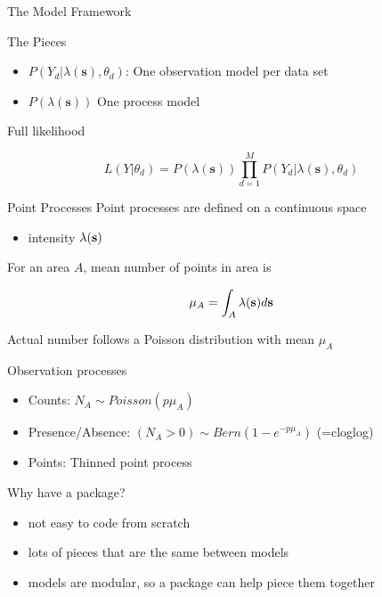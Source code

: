 \documentclass[
  ignorenonframetext,
]{beamer}
\providecommand{\tightlist}{%
  \setlength{\itemsep}{0pt}\setlength{\parskip}{0pt}}\usepackage{longtable,booktabs,array}
\begin{document}
\begin{frame}{The Model Framework}
\label{the-model-framework}
\begin{block}{The Pieces}
\label{the-pieces}
\begin{itemize}
\tightlist
\item
  \(P(Y_d | \lambda(\mathbf{s}), \theta_d)\): One observation model per
  data set
\item
  \(P(\lambda(\mathbf{s}))\) One process model
\end{itemize}

Full likelihood

\[
L(Y | \theta_d) = P(\lambda(\mathbf{s})) \prod_{d=1}^{M}P(Y_d | \lambda(\mathbf{s}), \theta_d)
\]
\end{block}

\begin{block}{Point Processes}
\label{point-processes}
Point processes are defined on a continuous space

\begin{itemize}
\tightlist
\item
  intensity \(\lambda({\bf s})\)
\end{itemize}

For an area \(A\), mean number of points in area is

\[
\mu_A = \int_A \lambda({\bf s}) d{\bf s}
\]

Actual number follows a Poisson distribution with mean \(\mu_A\)
\end{block}

\begin{block}{Observation processes}
\label{observation-processes}
\begin{itemize}
\tightlist
\item
  Counts: \(N_A \sim Poisson(p \mu_A)\)
\item
  Presence/Absence: \((N_A >0) \sim Bern( 1-e^{-p \mu_A})\) (=cloglog)
\item
  Points: Thinned point process
\end{itemize}
\end{block}
\end{frame}

\begin{frame}{Why have a package?}
\label{why-have-a-package}
\begin{itemize}
\tightlist
\item
  not easy to code from scratch
\item
  lots of pieces that are the same between models
\item
  models are modular, so a package can help piece them together
\end{itemize}
\end{frame}
\end{document}
